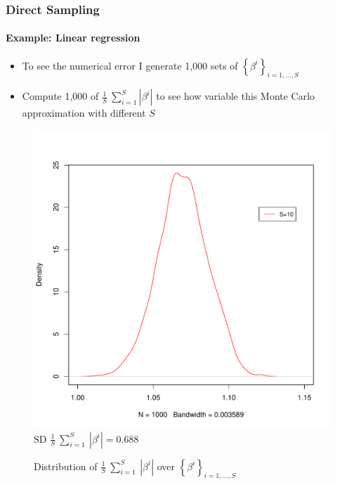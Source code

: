 \documentclass[
  shownotes,
  xcolor={svgnames},
  hyperref={colorlinks,citecolor=DarkBlue,linkcolor=DarkRed,urlcolor=DarkBlue}
  , aspectratio=169]{beamer}
\begin{document}
\begin{frame}[fragile]
\frametitle{Direct Sampling}
\framesubtitle{Example: Linear regression}

\begin{itemize}
\item To see the numerical error I generate 1,000 sets of $\left\{ \beta^{i} \right\}_{i = 1,\ldots,S}$

\item Compute 1,000 of $\frac{1}{S}\ \sum_{i = 1}^{S}\left| \beta^{i} \right|$ to see how variable this Monte Carlo approximation with different $S$

\end{itemize}


  \begin{figure}[H] \centering
  \centering
  \caption{Distribution of $\frac{1}{S}\ \sum_{i = 1}^{S}{\ \left| \beta^{i} \right|}$ over $\left\{ \beta^{i} \right\}_{i = 1,\ldots,S}$}
  \includegraphics[scale=0.2]{figures/n10}
  \\
  \tiny 
  $\text{SD\ }\frac{1}{S}\ \sum_{i = 1}^{S}{\ \left| \beta^{i} \right|} = 0.688$
\end{figure}




\end{frame}
\end{document}
